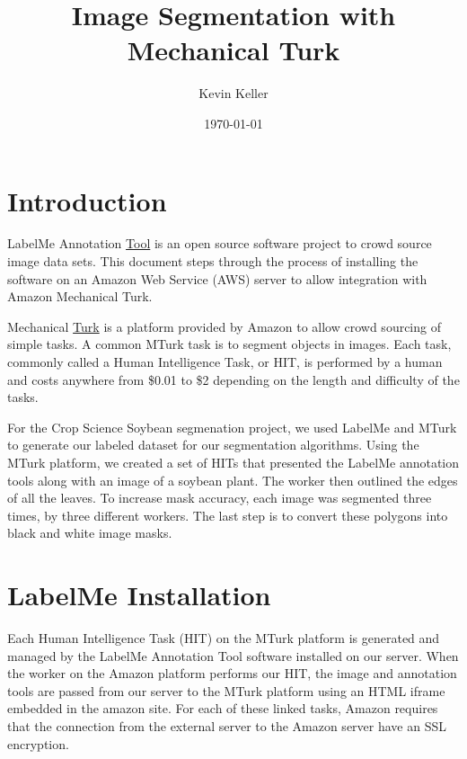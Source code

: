 \documentclass[a4paper]{article}
\title{Image Segmentation with Mechanical Turk}
\author{Kevin Keller}
\date{\today}
\begin{document}
\maketitle

\tableofcontents

\newpage


\section{Introduction}
\label{sec:introduction}

LabelMe Annotation \href{http://labelme.csail.mit.edu/Release3.0}{Tool} is an open source software project to crowd source image data sets. This document steps through the process of installing the software on an Amazon Web Service (AWS) server to allow integration with Amazon Mechanical Turk. 

Mechanical \href{https://www.mturk.com/}{Turk} is a platform provided by Amazon to allow crowd sourcing of simple tasks. A common MTurk task is to segment objects in images. Each task, commonly called a Human Intelligence Task, or HIT, is performed by a human and costs anywhere from \$0.01 to \$2 depending on the length and difficulty of the tasks. 

For the Crop Science Soybean segmenation project, we used LabelMe and MTurk to generate our labeled dataset for our segmentation algorithms. Using the MTurk platform, we created a set of HITs that presented the LabelMe annotation tools along with an image of a soybean plant. The worker then outlined the edges of all the leaves. To increase mask accuracy, each image was segmented three times, by three different workers. The last step is to convert these polygons into black and white image masks. 


\section{LabelMe Installation}
\label{sec:Installation}

Each Human Intelligence Task (HIT) on the MTurk platform is generated and managed by the LabelMe Annotation Tool software installed on our server. When the worker on the Amazon platform performs our HIT, the image and annotation tools are passed from our server to the MTurk platform using an HTML iframe embedded in the amazon site. For each of these linked tasks, Amazon requires that the connection from the external server to the Amazon server have an SSL encryption. 
\end{document}
